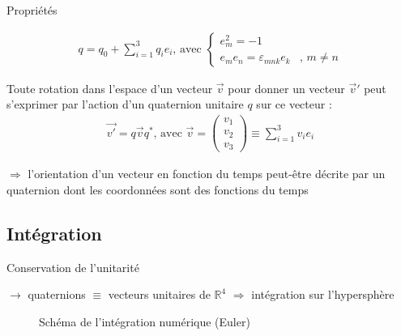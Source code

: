 \documentclass{beamer}
\begin{document}
\begin{frame}{Propriétés}


\begin{defi}[Quaternions]
\begin{align*}
q = q_0 + \sum_{i=1}^{3}q_i e_i\text{, avec } \begin{cases} e_m^2 = -1& \\ e_me_n = \varepsilon_{mnk} e_k&\text{, } m \neq n \end{cases}
\end{align*}
\end{defi}

\begin{theo}
Toute rotation dans l'espace d'un vecteur $\vec{v}$ pour donner un vecteur $\vec{v}\prime$ peut s'exprimer par l'action d'un quaternion unitaire $q$ sur ce vecteur :
\vspace{-10pt}
\begin{align*}
\vec{v'} = q\vec{v}q^* \text{, avec } \vec{v}=\begin{pmatrix}v_1\\v_2\\v_3\end{pmatrix}\equiv\sum_{i=1}^3 v_ie_i
\end{align*}
\end{theo}

$\Rightarrow$ l’orientation d’un vecteur en fonction du temps peut-être décrite par un quaternion dont les coordonnées sont des fonctions du temps

\end{frame}

\subsection{Intégration}

\begin{frame}{Conservation de l'unitarité}

$\rightarrow$ quaternions $\equiv$ vecteurs unitaires de $\mathbb{R}^4$ $\Rightarrow$ intégration sur l'hypersphère
\vspace{-10pt}

\begin{figure}[h!]
\centering

\caption{Schéma de l'intégration numérique (Euler)}
\end{figure}

\end{frame}
\end{document}
